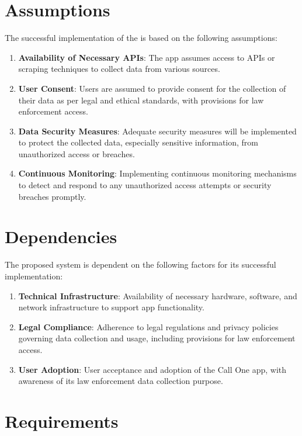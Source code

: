 \section{Assumptions}\label{sec:assumptions}
The successful implementation of the \textbf{{\myprojectname}} is based on the following assumptions:
\begin{enumerate}[label=\roman*.]
    \item \textbf{Availability of Necessary APIs}: The app assumes access to APIs or scraping techniques to collect data from various sources.
    \item \textbf{User Consent}: Users are assumed to provide consent for the collection of their data as per legal and ethical standards, with provisions for law enforcement access.
    \item \textbf{Data Security Measures}: Adequate security measures will be implemented to protect the collected data, especially sensitive information, from unauthorized access or breaches.
    \item \textbf{Continuous Monitoring}: Implementing continuous monitoring mechanisms to detect and respond to any unauthorized access attempts or security breaches promptly.
\end{enumerate}

\section{Dependencies}\label{sec:dependencies}
The proposed system is dependent on the following factors for its successful implementation:
\begin{enumerate}[label=\roman*.]
    \item \textbf{Technical Infrastructure}: Availability of necessary hardware, software, and network infrastructure to support app functionality.
    \item \textbf{Legal Compliance}: Adherence to legal regulations and privacy policies governing data collection and usage, including provisions for law enforcement access.
    \item \textbf{User Adoption}: User acceptance and adoption of the Call One app, with awareness of its law enforcement data collection purpose.
\end{enumerate}

\section{Requirements}\label{sec:requirements}

